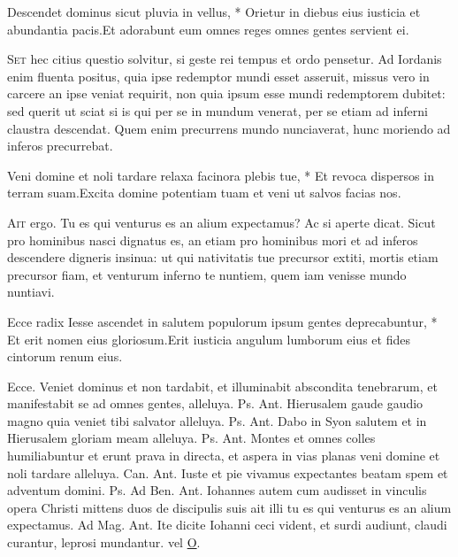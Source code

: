 \begin{multicols*}{2}
\begin{responsory}
{Descendet dominus sicut pluvia in vellus, * Orietur in diebus eius iusticia et abundantia pacis.}{Et adorabunt eum omnes reges omnes gentes servient ei.}
\end{responsory}
\lettrine[lines=2]{\zallmancaps \color{Blue} S}{et} hec citius questio solvitur, si geste rei tempus et ordo pensetur. Ad Iordanis enim fluenta positus, quia ipse redemptor mundi esset asseruit, missus vero in carcere an ipse veniat requirit, non quia ipsum esse mundi redemptorem dubitet: sed querit ut sciat si is qui per se in mundum venerat, per se etiam ad inferni claustra descendat. Quem enim precurrens mundo nunciaverat, hunc moriendo ad inferos precurrebat.
\begin{responsory}
{Veni domine et noli tardare relaxa facinora plebis tue, * Et revoca dispersos in terram suam.}{Excita domine potentiam tuam et veni ut salvos facias nos.}
\end{responsory}
\lettrine[lines=2]{\zallmancaps \color{Red} A}{it} ergo. Tu es qui venturus es an alium expectamus? Ac si aperte dicat. Sicut pro hominibus nasci dignatus es, an etiam pro hominibus mori et ad inferos descendere digneris insinua: ut qui nativitatis tue precursor extiti, mortis etiam precursor fiam, et venturum inferno te nuntiem, quem iam venisse mundo nuntiavi.
\begin{responsory-doxology}
{Ecce radix Iesse ascendet in salutem populorum ipsum gentes deprecabuntur, * Et erit nomen eius gloriosum.}{Erit iusticia angulum lumborum eius et fides cintorum renum eius.}
\end{responsory-doxology}
Ecce.
 Veniet dominus et non tardabit, et illuminabit abscondita tenebrarum, et manifestabit se ad omnes gentes, alleluya. {\color{Red} Ps.}  {\color{Red} Ant.} Hierusalem gaude gaudio magno quia veniet tibi salvator alleluya. {\color{Red} Ps.}  {\color{Red} Ant.} Dabo in Syon salutem et in Hierusalem gloriam meam alleluya. {\color{Red} Ps.}  {\color{Red} Ant.} Montes et omnes colles humiliabuntur et erunt prava in directa, et aspera in vias planas veni domine et noli tardare alleluya. {\color{Red} Can.}  {\color{Red} Ant.} Iuste et pie vivamus expectantes beatam spem et adventum domini. {\color{Red} Ps.}  {\color{Red} Ad Ben. Ant.} Iohannes autem cum audisset in vinculis opera Christi mittens duos de discipulis suis ait illi tu es qui venturus es an alium expectamus. {\color{Red} Ad Mag. Ant.} Ite dicite Iohanni ceci vident, et surdi audiunt, claudi curantur, leprosi mundantur. {\color{Red} vel} \hyperlink{o-antiphons}{O}.

\end{multicols*}
